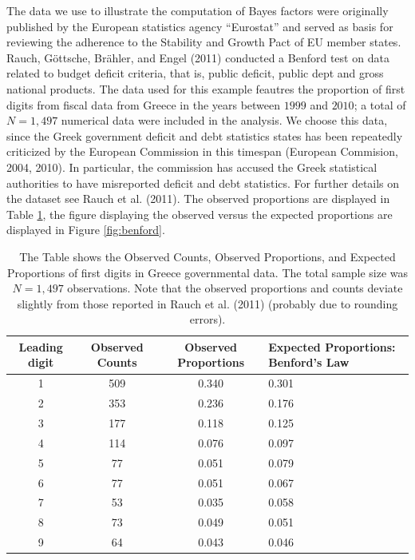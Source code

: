 \documentclass[
  english,
  man,floatsintext]{apa6}
\begin{document}
The data we use to illustrate the computation of Bayes factors were originally published by the European statistics agency ``Eurostat'' and served as basis for reviewing the adherence to the Stability and Growth Pact of EU member states. Rauch, Göttsche, Brähler, and Engel (2011) conducted a Benford test on data related to budget deficit criteria, that is, public deficit, public dept and gross national products. The data used for this example feautres the proportion of first digits from fiscal data from Greece in the years between \(1999\) and \(2010\); a total of \(N= 1{,}497\) numerical data were included in the analysis. We choose this data, since the Greek government deficit and debt statistics states has been repeatedly criticized by the European Commission in this timespan (European Commision, 2004, 2010). In particular, the commission has accused the Greek statistical authorities to have misreported deficit and debt statistics. For further details on the dataset see Rauch et al. (2011). The observed proportions are displayed in Table \ref{Tab:benford}, the figure displaying the observed versus the expected proportions are displayed in Figure \ref{fig:benford}.

\begin{table}[h]
    \centering
    \caption{The Table shows the Observed Counts, Observed Proportions, and Expected Proportions of first digits in Greece governmental data. The total sample size was $N = 1{,}497$ observations. Note that the observed proportions and counts deviate slightly from those reported in Rauch et al. (2011) (probably due to rounding errors).}
    \begin{tabular}{cccp{4cm}}
        \hline
Leading digit & Observed Counts & Observed Proportions & Expected Proportions: Benford's Law  \\
        \hline
        1 & 509 & 0.340 & 0.301  \\
        2 & 353 & 0.236 & 0.176  \\
        3 & 177 & 0.118 & 0.125  \\
        4 & 114 & 0.076 & 0.097  \\
        5 & 77 & 0.051 & 0.079  \\
        6 & 77 & 0.051 & 0.067  \\
        7 & 53 & 0.035 & 0.058  \\
        8 & 73 & 0.049 & 0.051  \\
        9 & 64 & 0.043 & 0.046  \\
        \hline
    \end{tabular}
    \label{Tab:benford}
\end{table}
\end{document}
